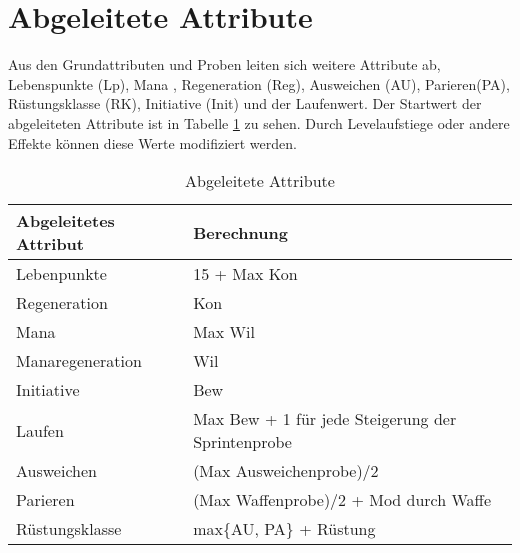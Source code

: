 \documentclass[../../Heldenanleitung2]{subfiles}
\begin{document}
\section{Abgeleitete Attribute}
Aus den Grundattributen und Proben leiten sich weitere Attribute ab, Lebenspunkte (Lp), Mana , Regeneration (Reg), Ausweichen (AU), Parieren(PA), Rüstungsklasse (RK), Initiative (Init) und der Laufenwert. Der Startwert der abgeleiteten Attribute ist in Tabelle \ref{tab:AbgeleiteteAtribute} zu sehen. Durch Levelaufstiege oder andere Effekte können diese Werte modifiziert werden.

\renewcommand{\arraystretch}{1.5}
{
\begin{table}[h!]
\centering
\caption{Abgeleitete Attribute}
\label{tab:AbgeleiteteAtribute}
\begin{tabular}{|l|l|}
\hline
\textbf{Abgeleitetes Attribut} & \textbf{Berechnung}\\
\hline
Lebenpunkte & 15 + Max Kon\\
Regeneration & Kon\\
Mana & Max Wil\\
Manaregeneration & Wil\\
Initiative & Bew\\
Laufen & Max Bew + 1 für jede Steigerung der Sprintenprobe\\
Ausweichen & (Max Ausweichenprobe)/2\\
Parieren & (Max Waffenprobe)/2 + Mod durch Waffe\\
Rüstungsklasse & max\{AU, PA\} + Rüstung
\\
\hline
\end{tabular}
\end{table}
}
\end{document}
